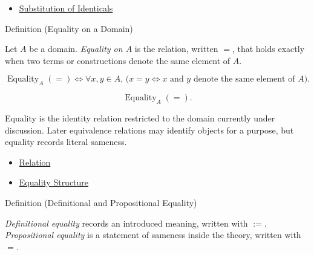 \begin{dependencies}
\begin{itemize}
  \item \hyperref[ax:axiomatic-equality-substitution]{Substitution of Identicals}
\end{itemize}
\end{dependencies}

\begin{definitionbox}{Definition (Equality on a Domain)}
\begin{definition}
\label{def:equality-relation}
Let $A$ be a domain. \emph{Equality on $A$} is the relation, written $=$,
that holds exactly when two terms or constructions denote the same element of
$A$.
\end{definition}
\end{definitionbox}

\begin{remark*}
\[
\operatorname{Equality}_A(=)
\Longleftrightarrow
\forall x,y \in A,\,
\bigl(x=y \Longleftrightarrow x \text{ and } y \text{ denote the same element of } A\bigr).
\]
\end{remark*}

\begin{remark*}
\[
\operatorname{Equality}_A(=).
\]
\end{remark*}

\begin{remark*}[Interpretation]
Equality is the identity relation restricted to the domain currently under
discussion. Later equivalence relations may identify objects for a purpose,
but equality records literal sameness.
\end{remark*}

\begin{dependencies}
\begin{itemize}
  \item \hyperref[def:relation]{Relation}
  \item \hyperref[def:axiomatic-equality-structure]{Equality Structure}
\end{itemize}
\end{dependencies}

\begin{definitionbox}{Definition (Definitional and Propositional Equality)}
\begin{definition}
\label{def:definitional-propositional-equality}
\emph{Definitional equality} records an introduced meaning, written with
$:=$. \emph{Propositional equality} is a statement of sameness inside the
theory, written with $=$.
\end{definition}
\end{definitionbox}

